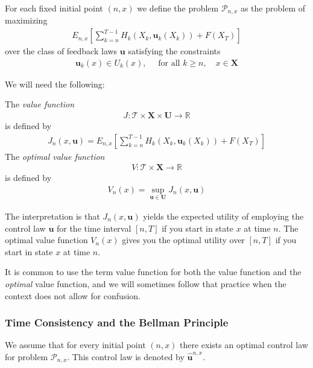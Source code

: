 \documentclass[\topdir/lecture\_notes.tex]{subfiles}
\begin{document}
\begin{defn}
For each fixed initial point $(n, x)$ we define the problem $\mathcal{P}_{n, x}$ as the problem of maximizing
\begin{align*}
E_{n, x}\left[\sum_{k=n}^{T-1} H_{k}(X_{k}, \mathbf{u}_{k}(X_{k}))+F(X_{T})\right]
\end{align*}
over the class of feedback laws $\mathbf{u}$ satisfying the constraints
\begin{align*}
\mathbf{u}_{k}(x) \in U_{k}(x), \quad \text { for all } k \geq n, \quad x \in \mathbf{X}
\end{align*}
\end{defn}
We will need the following:
\begin{defn}
The \emph{value function}
\begin{align*}
J: \mathcal{T} \times \mathbf{X} \times \mathbf{U} \rightarrow \mathbb{R}
\end{align*}
is defined by
\begin{align*}
J_{n}(x, \mathbf{u})=E_{n, x}\left[\sum_{k=n}^{T-1} H_{k}(X_{k}, \mathbf{u}_{k}(X_{k}))+F(X_{T})\right]
\end{align*}
The \emph{optimal value function}
\begin{align*}
V: \mathcal{T} \times \mathbf{X} \rightarrow \mathbb{R}
\end{align*}
is defined by
\begin{align*}
V_{n}(x)=\sup_{\mathbf{u} \in \mathbf{U}} J_{n}(x, \mathbf{u})
\end{align*}
\end{defn}
The interpretation is that $J_{n}(x, \mathbf{u})$ yields the expected utility of employing the control law $\mathbf{u}$ for the time interval $[n, T]$ if you start in state $x$ at time $n$. The optimal value function $V_{n}(x)$ gives you the optimal utility over $[n, T]$ if you start in state $x$ at time $n$.

\begin{remark}
It is common to use the term value function for both the value function and the \textit{optimal} value function, and we will sometimes follow that practice when the context does not allow for confusion.
\end{remark}

\subsubsection*{Time Consistency and the Bellman Principle}
We assume that for every initial point $(n, x)$ there exists an optimal control law for problem $\mathcal{P}_{n, x}$. This control law is denoted by $\hat{\mathbf{u}}^{n, x}$.
\end{document}
